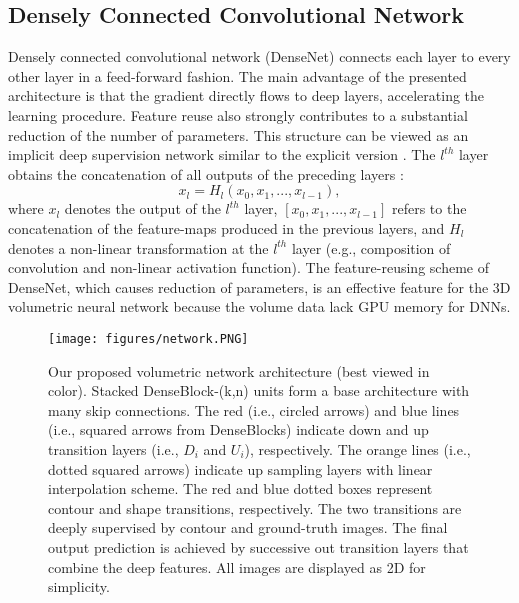 \documentclass[journal]{IEEEtran}
\begin{document}
\subsection{Densely Connected Convolutional Network}
Densely connected convolutional network (DenseNet) \cite{huang2017densely} connects each layer to every other layer in a feed-forward fashion. The main advantage of the presented architecture is that the gradient directly flows to deep layers, accelerating the learning procedure. Feature reuse also strongly contributes to a substantial reduction of the number of parameters. This structure can be viewed as an implicit deep supervision network similar to the explicit version \cite{lee2015deeply}. The \(l^{th}\) layer obtains the concatenation of all outputs of the preceding layers \cite{huang2017densely}:
\newline
\begin{equation}
    x_l=H_l(x_0, x_1, ..., x_{l-1}),
\label{eq:densenet}
\end{equation}\newline
where \(x_l\) denotes the output of the \(l^{th}\) layer, \([x_0, x_1, ..., x_{l-1}]\) refers to the concatenation of the feature-maps produced in the previous layers, and \(H_l\) denotes a non-linear transformation at the \(l^{th}\) layer (e.g., composition of convolution and non-linear activation function). The feature-reusing scheme of DenseNet, which causes reduction of parameters, is an effective feature for the 3D volumetric neural network because the volume data lack GPU memory for DNNs.

\begin{figure*}[h!bt]
    \centering
    \texttt{[image: figures/network.PNG]}
    \caption{Our proposed volumetric network architecture (best viewed in color). Stacked DenseBlock-(k,n) units form a base architecture with many skip connections. The red (i.e., circled arrows) and blue lines (i.e., squared arrows from DenseBlocks) indicate down and up transition layers (i.e., \(D_i\) and \(U_i\)), respectively. The orange lines (i.e., dotted squared arrows) indicate up sampling layers with linear interpolation scheme. The red and blue dotted boxes represent contour and shape transitions, respectively. The two transitions are deeply supervised by contour and ground-truth images. The final output prediction is achieved by successive out transition layers that combine the deep features. All images are displayed as 2D for simplicity.}
    \label{fig:network}
\end{figure*}
\end{document}
